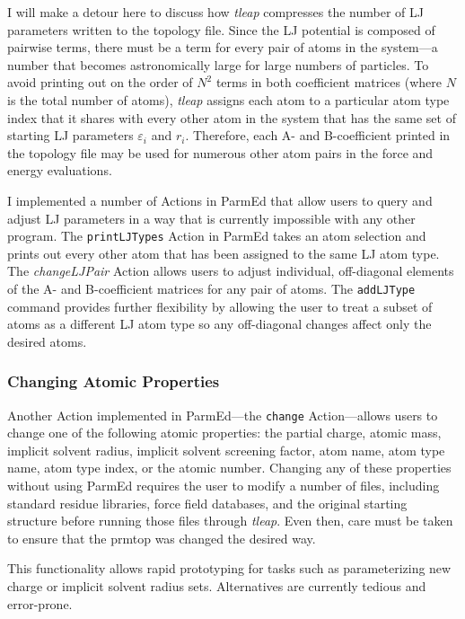 I will make a detour here to discuss how \emph{tleap} compresses the number of
LJ parameters written to the topology file. Since the LJ potential is composed
of pairwise terms, there must be a term for every pair of atoms in the
system---a number that becomes astronomically large for large numbers of
particles. To avoid printing out on the order of $N^2$ terms in both coefficient
matrices (where $N$ is the total number of atoms), \emph{tleap} assigns each
atom to a particular atom type index that it shares with every other atom in the
system that has the same set of starting LJ parameters $\varepsilon_i$ and
$r_i$. Therefore, each A- and B-coefficient printed in the topology file may be
used for numerous other atom pairs in the force and energy evaluations.

I implemented a number of Actions in ParmEd that allow users to query and adjust
LJ parameters in a way that is currently impossible with any other program. The
{\tt printLJTypes} Action in ParmEd takes an atom selection and prints out every
other atom that has been assigned to the same LJ atom type. The
\emph{changeLJPair} Action allows users to adjust individual, off-diagonal
elements of the A- and B-coefficient matrices for any pair of atoms. The
{\tt addLJType} command provides further flexibility by allowing the user to
treat a subset of atoms as a different LJ atom type so any off-diagonal changes
affect only the desired atoms.

\subsubsection{Changing Atomic Properties}

Another Action implemented in ParmEd---the {\tt change} Action---allows users to
change one of the following atomic properties: the partial charge, atomic mass,
implicit solvent radius, implicit solvent screening factor, atom name, atom type
name, atom type index, or the atomic number. Changing any of these properties
without using ParmEd requires the user to modify a number of files, including
standard residue libraries, force field databases, and the original starting
structure before running those files through \emph{tleap}. Even then, care must
be taken to ensure that the prmtop was changed the desired way.

This functionality allows rapid prototyping for tasks such as parameterizing new
charge or implicit solvent radius sets. Alternatives are currently tedious and
error-prone.

